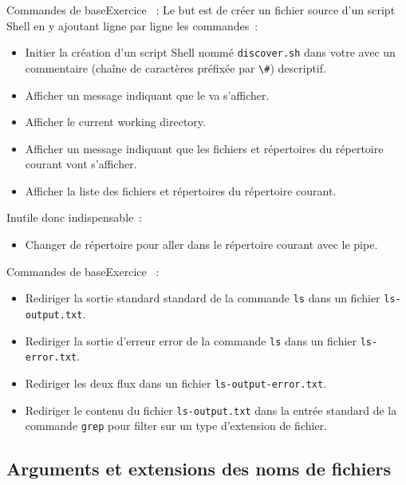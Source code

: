 \documentclass{beamer}
\begin{document}
    \begin{frame}{Commandes de base}{Exercice \execcounterdispinc{}~:}
        Le but est de créer un fichier source d'un script Shell en y ajoutant ligne par ligne les commandes~:
        \begin{itemize}
            \item Initier la création d'un script Shell nommé \lstinline{discover.sh} dans votre  avec un commentaire (chaîne de caractères préfixée par \lstinline{\#}) descriptif.
            \item Afficher un message indiquant que le  va s'afficher.
            \item Afficher le current working directory.
            \item Afficher un message indiquant que les fichiers et répertoires du répertoire courant vont s'afficher.
            \item Afficher la liste des fichiers et répertoires du répertoire courant.
        \end{itemize}

        Inutile donc indispensable~:
        \begin{itemize}
            \item Changer de répertoire pour aller dans le répertoire courant avec le pipe.
        \end{itemize}
    \end{frame}

    \begin{frame}{Commandes de base}{Exercice \execcounterdispinc{}~:}
        \begin{itemize}
            \item Rediriger la sortie standard standard de la commande \lstinline{ls} dans un fichier \lstinline{ls-output.txt}.
            \item Rediriger la sortie d'erreur error de la commande \lstinline{ls} dans un fichier \lstinline{ls-error.txt}.
            \item Rediriger les deux flux dans un fichier \lstinline{ls-output-error.txt}.
            \item Rediriger le contenu du fichier \lstinline{ls-output.txt} dans la entrée standard de la commande \lstinline{grep} pour filter sur un type d'extension de fichier.
        \end{itemize}
    \end{frame}

    \subsection{Arguments et extensions des noms de fichiers}\label{subsec:arguments-extension}
\end{document}
